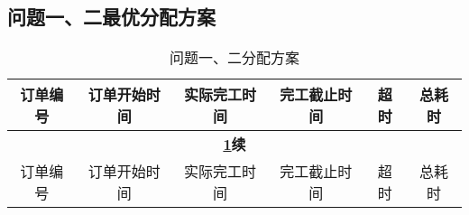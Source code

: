 \newpage

\begin{appendices}
\section{问题一、二最优分配方案}

\begin{center}
\begin{longtable}{|c|c|c|c|c|c|}
\caption{问题一、二分配方案} 
\label{tab:problem1}\\
\hline
订单编号     & 订单开始时间 & 实际完工时间 & 完工截止时间 & 超时 & 总耗时 \\ \hline
\endfirsthead

\multicolumn{6}{c}{\textbf{\cref{tab:problem1}续}} \\
\hline
订单编号     & 订单开始时间 & 实际完工时间 & 完工截止时间 & 超时 & 总耗时  \\
\hline
\endhead



\end{longtable}
\end{center}
\end{appendices}

